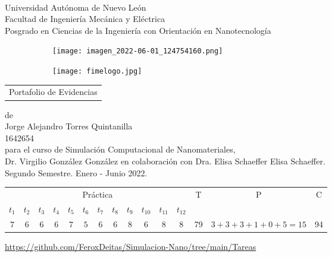 \documentclass[letterpaper, 10 pt, conference]{article}
\begin{document}
\thispagestyle{empty}
\vspace{10 cm}
\begin{scshape}
\begin{center}
	{$\,$} \\[20 mm]
	{\Large{Universidad Autónoma de Nuevo León}} \\[5mm]
	{\large{Facultad de Ingeniería Mecánica y Eléctrica}} \\[5mm]
	{\large{Posgrado en Ciencias de la Ingeniería con Orientación en Nanotecnología}} \\[5 mm]
	\vskip16mm
	\begin{figure}[h!]
		\centering
		\begin{subfigure}{0.3\linewidth}
			\texttt{[image: imagen\_2022-06-01\_124754160.png]}
		\end{subfigure}
		\hspace{15 mm}
		\begin{subfigure}{0.32\linewidth}
			\texttt{[image: fimelogo.jpg]}
		\end{subfigure}
	\end{figure}
	\vskip16mm
	\begin{tabular}{p{11cm}}
		\centering
		{\large Portafolio de Evidencias}
	\end{tabular}
	\vskip7mm
	{de}\\[7mm]
	{\large Jorge Alejandro Torres Quintanilla}\\[3mm]
	{1642654}\\[7 mm]
	{para el curso de Simulación Computacional de Nanomateriales,}\\[3mm]
	{Dr. Virgilio González González en colaboración con Dra. Elisa Schaeffer Elisa Schaeffer.}\\[3mm]
	Segundo Semestre. Enero - Junio 2022. \\ [5 mm]
	\begin{table}[ht]
\centering

\begin{tabular}{|c|c|c|c|c|c|c|c|c|c|c|c|c|c|c|} 
 \hline
 \multicolumn{12}{|c|}{Práctica} & \multirow{2}{*}{T} & \multirow{2}{*}{P} & \multirow{2}{*}{C} \\
 \cline{1-12}
 $t_1$ & $t_2$ & $t_3$ & $t_4$ & $t_5$ & $t_6$ & $t_7$ & $t_8$ & $t_9$ & $t_{10}$ & $t_{11}$ & $t_{12}$ & & & \\
 \hline
 $7$ & $6$ & $6$ & $6$ & $7$ & $5$ & $6$ & $6$ & $8$ & $6$ & $8$ & $8$ & \multicolumn{1}{|c|}{79} & $3+3+3+1+0+5=15$ & \multicolumn{1}{|c|}{94}\\
 \hline
\end{tabular}
\label{Cuadro3}
\end{table}

\url{https://github.com/FeroxDeitas/Simulacion-Nano/tree/main/Tareas}
	\vfill
\end{center}
\end{scshape}
\end{document}
